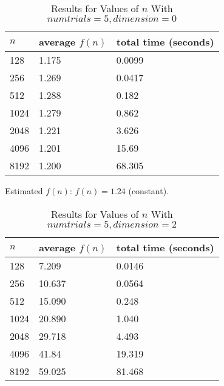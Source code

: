 \documentclass[11pt]{article}
\begin{document}
	\begin{table}[h]
		\centering
		\caption{Results for Values of $n$ With $numtrials = 5, dimension = 0$}
		\begin{tabular}{lll}
			$n$                         & average $f(n)$                        & total time (seconds)                        \\ \hline
			\multicolumn{1}{|l|}{128} & \multicolumn{1}{l|}{1.175} & \multicolumn{1}{l|}{0.0099} \\ \hline
			\multicolumn{1}{|l|}{256}    & \multicolumn{1}{l|}{1.269}       & \multicolumn{1}{l|}{0.0417}       \\ \hline
			\multicolumn{1}{|l|}{512}    & \multicolumn{1}{l|}{1.288}       & \multicolumn{1}{l|}{0.182}       \\ \hline
			\multicolumn{1}{|l|}{1024}    & \multicolumn{1}{l|}{1.279}       & \multicolumn{1}{l|}{0.862}       \\ \hline
			\multicolumn{1}{|l|}{2048}    & \multicolumn{1}{l|}{1.221}       & \multicolumn{1}{l|}{3.626}       \\ \hline
			\multicolumn{1}{|l|}{4096}    & \multicolumn{1}{l|}{1.201}       & \multicolumn{1}{l|}{15.69}       \\ \hline
			\multicolumn{1}{|l|}{8192}    & \multicolumn{1}{l|}{1.200}       & \multicolumn{1}{l|}{68.305}       \\ \hline
		\end{tabular}
	\end{table}
	Estimated $f(n)$: $f(n) = 1.24$ (constant).\\
	
	\begin{table}[h]
		\centering
		\caption{Results for Values of $n$ With $numtrials = 5, dimension = 2$}
		\begin{tabular}{lll}
			$n$                         & average $f(n)$                        & total time (seconds)                        \\ \hline
			\multicolumn{1}{|l|}{128} & \multicolumn{1}{l|}{7.209} & \multicolumn{1}{l|}{0.0146} \\ \hline
			\multicolumn{1}{|l|}{256}    & \multicolumn{1}{l|}{10.637}       & \multicolumn{1}{l|}{0.0564}       \\ \hline
			\multicolumn{1}{|l|}{512}    & \multicolumn{1}{l|}{15.090}       & \multicolumn{1}{l|}{0.248}       \\ \hline
			\multicolumn{1}{|l|}{1024}    & \multicolumn{1}{l|}{20.890}       & \multicolumn{1}{l|}{1.040}       \\ \hline
			\multicolumn{1}{|l|}{2048}    & \multicolumn{1}{l|}{29.718}       & \multicolumn{1}{l|}{4.493}       \\ \hline
			\multicolumn{1}{|l|}{4096}    & \multicolumn{1}{l|}{41.84}       & \multicolumn{1}{l|}{19.319}       \\ \hline
			\multicolumn{1}{|l|}{8192}    & \multicolumn{1}{l|}{59.025}       & \multicolumn{1}{l|}{81.468}       \\ \hline
		\end{tabular}
	\end{table}
	
\end{document}

